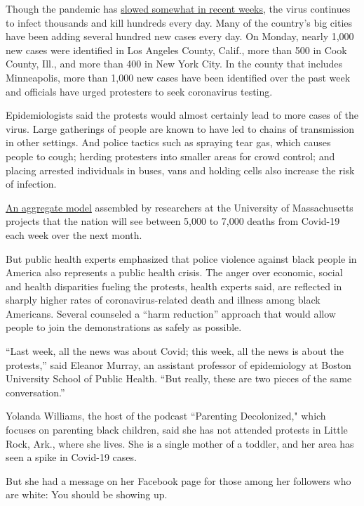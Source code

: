 Though the pandemic has
\href{https://www.nytimes3xbfgragh.onion/2020/06/01/us/coronavirus-united-states.html}{slowed
somewhat in recent weeks}, the virus continues to infect thousands and
kill hundreds every day. Many of the country's big cities have been
adding several hundred new cases every day. On Monday, nearly 1,000 new
cases were identified in Los Angeles County, Calif., more than 500 in
Cook County, Ill., and more than 400 in New York City. In the county
that includes Minneapolis, more than 1,000 new cases have been
identified over the past week and officials have urged protesters to
seek coronavirus testing.

Epidemiologists said the protests would almost certainly lead to more
cases of the virus. Large gatherings of people are known to have led to
chains of transmission in other settings. And police tactics such as
spraying tear gas, which causes people to cough; herding protesters into
smaller areas for crowd control; and placing arrested individuals in
buses, vans and holding cells also increase the risk of infection.

\href{https://reichlab.io/covid19-forecast-hub/}{An aggregate model}
assembled by researchers at the University of Massachusetts projects
that the nation will see between 5,000 to 7,000 deaths from Covid-19
each week over the next month.

But public health experts emphasized that police violence against black
people in America also represents a public health crisis. The anger over
economic, social and health disparities fueling the protests, health
experts said, are reflected in sharply higher rates of
coronavirus-related death and illness among black Americans. Several
counseled a ``harm reduction'' approach that would allow people to join
the demonstrations as safely as possible.

``Last week, all the news was about Covid; this week, all the news is
about the protests,'' said Eleanor Murray, an assistant professor of
epidemiology at Boston University School of Public Health. ``But really,
these are two pieces of the same conversation.''

Yolanda Williams, the host of the podcast ``Parenting Decolonized,"
which focuses on parenting black children, said she has not attended
protests in Little Rock, Ark., where she lives. She is a single mother
of a toddler, and her area has seen a spike in Covid-19 cases.

But she had a message on her Facebook page for those among her followers
who are white: You should be showing up.

